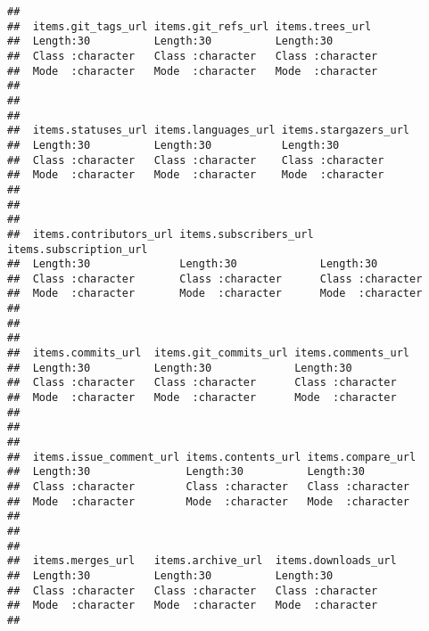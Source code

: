 \documentclass{article}\usepackage[]{graphicx}\usepackage[]{color}
\makeatletter
\newenvironment{kframe}{%
 \def\at@end@of@kframe{}%
 \ifinner\ifhmode%
  \def\at@end@of@kframe{\end{minipage}}%
  \begin{minipage}{\columnwidth}%
 \fi\fi%
 \def\FrameCommand##1{\hskip\@totalleftmargin \hskip-\fboxsep
 \colorbox{shadecolor}{##1}\hskip-\fboxsep
     \hskip-\linewidth \hskip-\@totalleftmargin \hskip\columnwidth}%
 \MakeFramed {\advance\hsize-\width
   \@totalleftmargin\z@ \linewidth\hsize
   \@setminipage}}%
 {\par\unskip\endMakeFramed%
 \at@end@of@kframe}
\newenvironment{knitrout}{}{} %
\makeatother
\begin{document}
\begin{knitrout}
\begin{kframe}
\begin{verbatim}
##                                                          
##  items.git_tags_url items.git_refs_url items.trees_url   
##  Length:30          Length:30          Length:30         
##  Class :character   Class :character   Class :character  
##  Mode  :character   Mode  :character   Mode  :character  
##                                                          
##                                                          
##                                                          
##  items.statuses_url items.languages_url items.stargazers_url
##  Length:30          Length:30           Length:30           
##  Class :character   Class :character    Class :character    
##  Mode  :character   Mode  :character    Mode  :character    
##                                                             
##                                                             
##                                                             
##  items.contributors_url items.subscribers_url items.subscription_url
##  Length:30              Length:30             Length:30             
##  Class :character       Class :character      Class :character      
##  Mode  :character       Mode  :character      Mode  :character      
##                                                                     
##                                                                     
##                                                                     
##  items.commits_url  items.git_commits_url items.comments_url
##  Length:30          Length:30             Length:30         
##  Class :character   Class :character      Class :character  
##  Mode  :character   Mode  :character      Mode  :character  
##                                                             
##                                                             
##                                                             
##  items.issue_comment_url items.contents_url items.compare_url 
##  Length:30               Length:30          Length:30         
##  Class :character        Class :character   Class :character  
##  Mode  :character        Mode  :character   Mode  :character  
##                                                               
##                                                               
##                                                               
##  items.merges_url   items.archive_url  items.downloads_url
##  Length:30          Length:30          Length:30          
##  Class :character   Class :character   Class :character   
##  Mode  :character   Mode  :character   Mode  :character   
##                                                           

\end{verbatim}
\end{kframe}
\end{knitrout}
\end{document}
